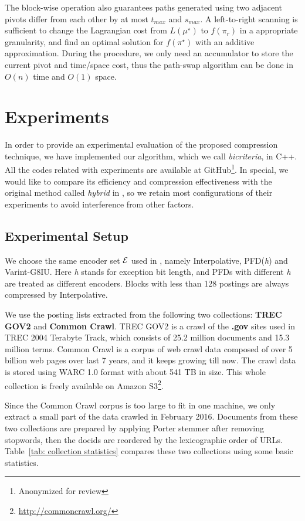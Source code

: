 \documentclass{sig-alternate-05-2015}
\begin{document}
The block-wise operation also guarantees paths generated using two adjacent pivots differ from each other by at most $ t_{max} $ and $ s_{max} $.
A left-to-right scanning is sufficient to change the Lagrangian cost from $ L(\mu^\star) $ to $ f(\pi_r) $ in a appropriate granularity, and find an optimal solution for $ f(\pi^\star) $ with an additive approximation.
During the procedure, we only need an accumulator to store the current pivot and time/space cost, thus the path-swap algorithm can be done in $ O(n) $ time and $ O(1) $ space.

\section{Experiments}\label{sec: experiments}
In order to provide an experimental evaluation of the proposed compression technique, we have implemented our algorithm, which we call \textit{bicriteria}, in C++.
All the codes related with experiments are available at GitHub\footnote{Anonymized for review}.
In special, we would like to compare its efficiency and compression effectiveness with the original method called \textit{hybrid} in \cite{ottaviano2015optimal}, so we retain most configurations of their experiments to avoid interference from other factors.

\subsection{Experimental Setup}
We choose the same encoder set $ \cal E $ used in \cite{ottaviano2015optimal}, namely Interpolative, PFD(\textit{h}) and Varint-G8IU.
Here \textit{h} stands for exception bit length, and PFDs with different \textit{h} are treated as different encoders.
Blocks with less than 128 postings are always compressed by Interpolative.

We use the posting lists extracted from the following two collections: \textbf{TREC GOV2} and \textbf{Common Crawl}.
TREC GOV2 is a crawl of the \textbf{.gov} sites used in TREC 2004 Terabyte Track, which consists of 25.2 million documents and 15.3 million terms.
Common Crawl is a corpus of web crawl data composed of over 5 billion web pages over last 7 years, and it keeps growing till now.
The crawl data is stored using WARC 1.0 format with about 541 TB in size.
This whole collection is freely available on Amazon S3\footnote{\url{http://commoncrawl.org/}}. 


Since the Common Crawl corpus is too large to fit in one machine, we only extract a small part of the data crawled in February 2016.
Documents from these two collections are prepared by applying Porter stemmer after removing stopwords, then the docids are reordered by the lexicographic order of URLs.
Table~\ref{tab: collection statistics} compares these two collections using some basic statistics.
\end{document}

